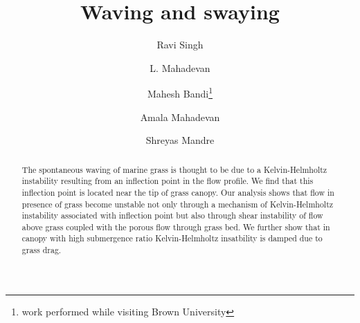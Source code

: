 \documentclass[aps,prl,twocolumn,showpacs,superscriptaddress,groupedaddress,10pt]{revtex4-1}  %
\begin{document}
\title{Waving and swaying}
\author{Ravi Singh}
\author{L. Mahadevan}
\author{Mahesh Bandi\footnote{work performed while visiting Brown University}}
\author{Amala Mahadevan}
\author{Shreyas Mandre}

\begin{abstract}


The spontaneous waving of marine grass is thought to be due to a Kelvin-Helmholtz instability resulting from an inflection point in the flow profile. We find that this inflection point
is located near the tip of grass canopy. Our analysis shows that flow in presence of grass become unstable not only through a mechanism of Kelvin-Helmholtz instability associated with 
inflection point but also through shear instability of flow above grass coupled with the porous flow through grass bed. We further show that in canopy with high submergence ratio
Kelvin-Helmholtz insatbility is damped due to grass drag. 

\end{abstract}
\maketitle
\end{document}
